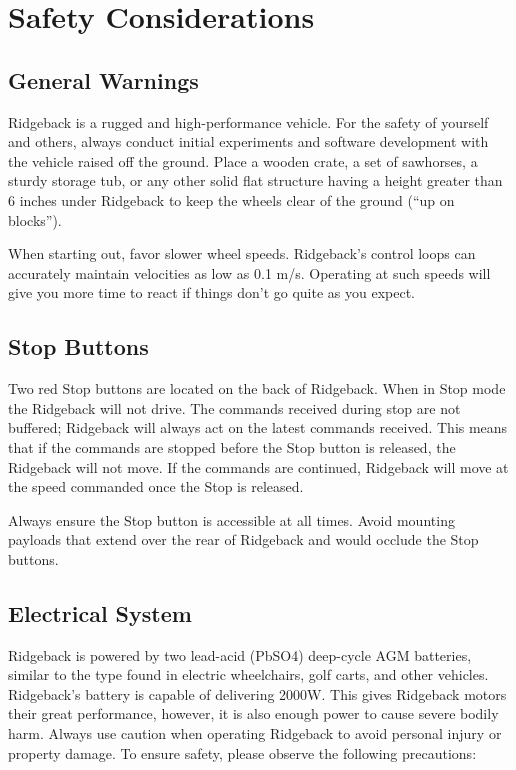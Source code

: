 \documentclass[]{clearpath-latex/clearpath-manual}
\begin{document}
\section{Safety Considerations}

\subsection{General Warnings}

Ridgeback is a rugged and high-performance vehicle. For the safety of yourself and others, always conduct initial experiments and software development with the vehicle raised off the ground. Place a wooden crate, a set of sawhorses, a sturdy storage tub, or any other solid flat structure having a height greater than 6 inches under Ridgeback to keep the wheels clear of the ground (“up on blocks”).

When starting out, favor slower wheel speeds. Ridgeback's control loops can accurately maintain velocities as low as 0.1 m/s. Operating at such speeds will give you more time to react if things don’t go quite as you expect.

\subsection{Stop Buttons}

Two red Stop buttons are located on the back of Ridgeback. When in Stop mode the Ridgeback will not drive. The commands received during stop are not buffered; Ridgeback will always act on the latest commands received. This means that if the commands are stopped before the Stop button is released, the Ridgeback will not move. If the commands are continued, Ridgeback will move at the speed commanded once the Stop is released.

Always ensure the Stop button is accessible at all times. Avoid mounting payloads that extend over the rear of Ridgeback and would occlude the Stop buttons.

\subsection{Electrical System}

Ridgeback is powered by two lead-acid (PbSO4) deep-cycle AGM batteries, similar to the type found in electric wheelchairs, golf carts, and other vehicles. Ridgeback's battery is capable of delivering 2000W. This gives Ridgeback motors their great performance, however, it is also enough power to cause severe bodily harm. Always use caution when operating Ridgeback to avoid personal injury or property damage.  To ensure safety, please observe the following precautions:
\end{document}
